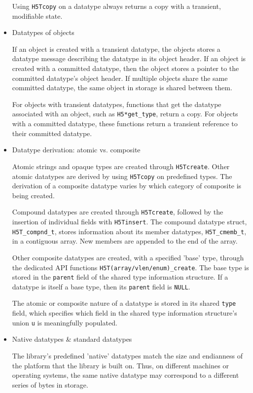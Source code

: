\begin{itemize}
Using \texttt{H5Tcopy} on a datatype always returns a copy with a transient, modifiable state.

    \item Datatypes of objects

If an object is created with a transient datatype, the objects stores a datatype message describing the datatype in its object header. If an object is created with a committed datatype, then the object stores a pointer to the committed datatype's object header. If multiple objects share the same committed datatype, the same object in storage is shared between them.

For objects with transient datatypes, functions that get the datatype associated with an object, such as \texttt{H5*get\_type}, return a copy. For objects with a committed datatype, these functions return a transient reference to their committed datatype.

    \item Datatype derivation: atomic vs. composite

Atomic strings and opaque types are created through \texttt{H5Tcreate}. Other atomic datatypes are derived by using \texttt{H5Tcopy} on predefined types. The derivation of a composite datatype varies by which category of composite is being created. 

Compound datatypes are created through \texttt{H5Tcreate}, followed by the insertion of individual fields with \texttt{H5Tinsert}. The compound datatype struct, \texttt{H5T\_compnd\_t}, stores information about its member datatypes, \texttt{H5T\_cmemb\_t}, in a contiguous array. New members are appended to the end of the array. %

Other composite datatypes are created, with a specified 'base' type, through the dedicated API functions \texttt{H5T(array/vlen/enum)\_create}. The base type is stored in the \texttt{parent} field of the shared type information structure. If a datatype is itself a base type, then its \texttt{parent} field is \texttt{NULL}.

The atomic or composite nature of a datatype is stored in its shared \texttt{type} field, which specifies which field in the shared type information structure's union \texttt{u} is meaningfully populated.

    \item Native datatypes \& standard datatypes

The library's predefined 'native' datatypes match the size and endianness of the platform that the library is built on. Thus, on different machines or operating systems, the same native datatype may correspond to a different series of bytes in storage. 


\end{itemize}
